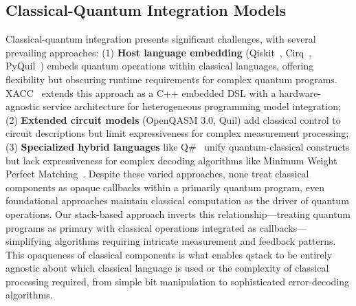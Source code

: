 \subsection{Classical-Quantum Integration Models}

Classical-quantum integration presents significant challenges, with several prevailing approaches: (1) \textbf{Host language embedding} (Qiskit~\cite{Qiskit}, Cirq~\cite{cirq}, PyQuil~\cite{pyquil}) embeds quantum operations within classical languages, offering flexibility but obscuring runtime requirements for complex quantum programs. XACC~\cite{mccaskey2020xacc} extends this approach as a C++ embedded DSL with a hardware-agnostic service architecture for heterogeneous programming model integration; (2) \textbf{Extended circuit models} (OpenQASM 3.0, Quil) add classical control to circuit descriptions but limit expressiveness for complex measurement processing; (3) \textbf{Specialized hybrid languages} like Q\#~\cite{qsharp} unify quantum-classical constructs but lack expressiveness for complex decoding algorithms like Minimum Weight Perfect Matching~\cite{higgott2022pymatching}. Despite these varied approaches, none treat classical components as opaque callbacks within a primarily quantum program, even foundational approaches maintain classical computation as the driver of quantum operations. Our stack-based approach inverts this relationship—treating quantum programs as primary with classical operations integrated as callbacks—simplifying algorithms requiring intricate measurement and feedback patterns. This opaqueness of classical components is what enables qstack to be entirely agnostic about which classical language is used or the complexity of classical processing required, from simple bit manipulation to sophisticated error-decoding algorithms.